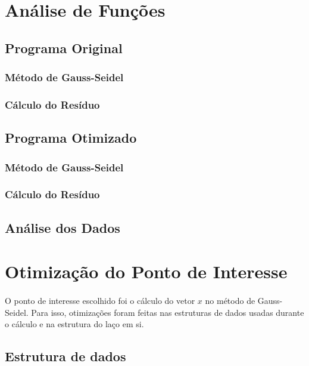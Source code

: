 \documentclass[12pt]{article}
\begin{document}
\section{Análise de Funções}

	\subsection{Programa Original}
		\subsubsection{Método de Gauss-Seidel}
		\subsubsection{Cálculo do Resíduo}
	
	\subsection{Programa Otimizado}
		\subsubsection{Método de Gauss-Seidel}
		\subsubsection{Cálculo do Resíduo}

	\subsection{Análise dos Dados}

\newpage

\section{Otimização do Ponto de Interesse}

\paragraph{}
O ponto de interesse escolhido foi o cálculo do vetor $x$ no método de Gauss-Seidel.
Para isso, otimizações foram feitas nas estruturas de dados usadas durante o cálculo e na estrutura do laço em si.

	\subsection{Estrutura de dados}
\end{document}
